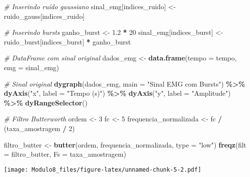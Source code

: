 \documentclass[
]{article}
\newenvironment{Shaded}{\begin{snugshade}}{\end{snugshade}}
\newcommand{\AttributeTok}[1]{\textcolor[rgb]{0.13,0.29,0.53}{#1}}
\newcommand{\CommentTok}[1]{\textcolor[rgb]{0.56,0.35,0.01}{\textit{#1}}}
\newcommand{\DecValTok}[1]{\textcolor[rgb]{0.00,0.00,0.81}{#1}}
\newcommand{\FloatTok}[1]{\textcolor[rgb]{0.00,0.00,0.81}{#1}}
\newcommand{\FunctionTok}[1]{\textcolor[rgb]{0.13,0.29,0.53}{\textbf{#1}}}
\newcommand{\NormalTok}[1]{#1}
\newcommand{\OtherTok}[1]{\textcolor[rgb]{0.56,0.35,0.01}{#1}}
\newcommand{\SpecialCharTok}[1]{\textcolor[rgb]{0.81,0.36,0.00}{\textbf{#1}}}
\newcommand{\StringTok}[1]{\textcolor[rgb]{0.31,0.60,0.02}{#1}}
\begin{document}
\begin{Shaded}
\begin{Highlighting}[]
\CommentTok{\# Inserindo ruído gaussiano}
\NormalTok{sinal\_emg[indices\_ruido] }\OtherTok{\textless{}{-}}\NormalTok{ ruido\_gauss[indices\_ruido]}

\CommentTok{\# Inserindo bursts}
\NormalTok{ganho\_burst }\OtherTok{\textless{}{-}} \FloatTok{1.2} \SpecialCharTok{*} \DecValTok{20}
\NormalTok{sinal\_emg[indices\_burst] }\OtherTok{\textless{}{-}}\NormalTok{ ruido\_burst[indices\_burst] }\SpecialCharTok{*}\NormalTok{ ganho\_burst}

\CommentTok{\# DataFrame com sinal original}
\NormalTok{dados\_emg }\OtherTok{\textless{}{-}} \FunctionTok{data.frame}\NormalTok{(}\AttributeTok{tempo =}\NormalTok{ tempo, }\AttributeTok{emg =}\NormalTok{ sinal\_emg)}

\CommentTok{\# Sinal original}
\FunctionTok{dygraph}\NormalTok{(dados\_emg, }\AttributeTok{main =} \StringTok{"Sinal EMG com Bursts"}\NormalTok{) }\SpecialCharTok{\%\textgreater{}\%}
  \FunctionTok{dyAxis}\NormalTok{(}\StringTok{"x"}\NormalTok{, }\AttributeTok{label =} \StringTok{"Tempo (s)"}\NormalTok{) }\SpecialCharTok{\%\textgreater{}\%}
  \FunctionTok{dyAxis}\NormalTok{(}\StringTok{"y"}\NormalTok{, }\AttributeTok{label =} \StringTok{"Amplitude"}\NormalTok{) }\SpecialCharTok{\%\textgreater{}\%}
  \FunctionTok{dyRangeSelector}\NormalTok{()}
\end{Highlighting}
\end{Shaded}

\begin{Shaded}
\begin{Highlighting}[]
\CommentTok{\# Filtro Butterworth}
\NormalTok{ordem }\OtherTok{\textless{}{-}} \DecValTok{3}
\NormalTok{fc }\OtherTok{\textless{}{-}} \DecValTok{5}  
\NormalTok{frequencia\_normalizada }\OtherTok{\textless{}{-}}\NormalTok{ fc }\SpecialCharTok{/}\NormalTok{ (taxa\_amostragem }\SpecialCharTok{/} \DecValTok{2}\NormalTok{)}

\NormalTok{filtro\_butter }\OtherTok{\textless{}{-}} \FunctionTok{butter}\NormalTok{(ordem, frequencia\_normalizada, }\AttributeTok{type =} \StringTok{"low"}\NormalTok{)}
\FunctionTok{freqz}\NormalTok{(}\AttributeTok{filt =}\NormalTok{ filtro\_butter, }\AttributeTok{Fs =}\NormalTok{ taxa\_amostragem)}
\end{Highlighting}
\end{Shaded}

\texttt{[image: Modulo8\_files/figure-latex/unnamed-chunk-5-2.pdf]}
\end{document}

